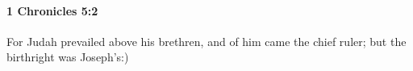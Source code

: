 
		\paragraph{1 Chronicles 5:2} %
			\label{1CHRONICLES-5-2}

			For Judah prevailed above his brethren, and of him came the chief ruler; but the birthright was Joseph’s:)


